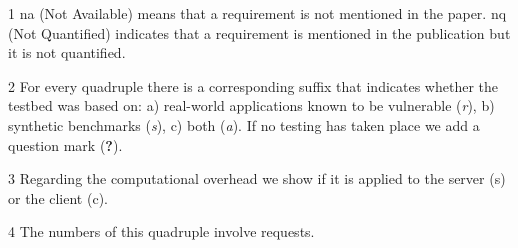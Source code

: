 \documentclass[conference]{IEEEtran}
\begin{document}
\begin{landscape}
\begin{table}
\begin{threeparttable}
\begin{small}
\begin{tablenotes}
\begin{footnotesize}
       	\item[1] {\sc na} (Not Available) means that a requirement is not mentioned in the paper.
	{\sc nq} (Not Quantified) indicates that a requirement is mentioned in the publication
	but it is not quantified.
		\item[2] For every quadruple there is a corresponding suffix that indicates whether the testbed was
	based on: a) real-world applications known to be vulnerable ({\it r}), b) synthetic benchmarks ({\it s}), c) both ({\it a}).
	If no testing has taken place we add a question mark ({\bf ?}).
    \item[3] Regarding the computational overhead we show if it is applied to the server ({\sc s}) or the client ({\sc c}). 
    \item[4] The numbers of this quadruple involve requests.
	\end{footnotesize}
    \end{tablenotes}
    \end{small}
    \end{threeparttable}
\end{table}
\end{landscape}
\end{document}
